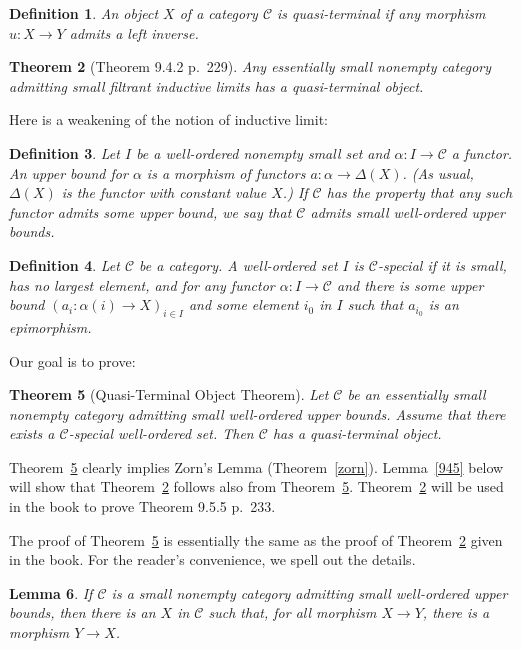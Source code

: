 \documentclass[12pt]{article}%
\newtheorem{thm}{Theorem}%
\newtheorem{lem}[thm]{Lemma}
\newtheorem{df}[thm]{Definition}%
\theoremstyle{remark}
\theoremstyle{definition}
\newcommand{\C}{\mathcal C}
\begin{document}
\begin{df}
An object $X$ of a category $\C$ is {\em quasi-terminal} if any morphism $u:X\to Y$ admits a left inverse.
\end{df}

\begin{thm}[Theorem 9.4.2 p.~229]\label{942}
Any essentially small nonempty category admitting small filtrant inductive limits has a quasi-terminal object.
\end{thm}

Here is a weakening of the notion of inductive limit:

\begin{df}
Let $I$ be a well-ordered nonempty small set and $\alpha:I\to\C$ a functor. An {\em upper bound} for $\alpha$ is a morphism of functors $a:\alpha\to\Delta(X)$. (As usual, $\Delta(X)$ is the functor with constant value $X$.) If $\C$ has the property that any such functor admits some upper bound, we say that $\C$ {\em admits small well-ordered upper bounds}.
\end{df}

\begin{df}
Let $\C$ be a category. A well-ordered set $I$ is $\C$-{\em special} if it is small, has no largest element, and for any functor $\alpha:I\to\C$ and there is some upper bound $(a_i:\alpha(i)\to X)_{i\in I}$ and some element $i_0$ in $I$ such that $a_{i_0}$ is an epimorphism. 
\end{df}

Our goal is to prove:

\begin{thm}[Quasi-Terminal Object Theorem]\label{qtot}
Let $\C$ be an essentially small nonempty category admitting small well-ordered upper bounds. Assume that there exists a $\C$-special well-ordered set. Then $\C$ has a quasi-terminal object.
\end{thm}

Theorem~\ref{qtot} clearly implies Zorn's Lemma (Theorem~\ref{zorn}). Lemma~\ref{945} below will show that Theorem~\ref{942} follows also from Theorem~\ref{qtot}. Theorem~\ref{942} will be used in the book to prove Theorem 9.5.5 p.~233.

The proof of Theorem~\ref{qtot} is essentially the same as the proof of Theorem~\ref{942} given in the book. For the reader's convenience, we spell out the details. 

\begin{lem}\label{943}
If $\C$ is a small nonempty category admitting small well-ordered upper bounds, then there is an $X$ in $\C$ such that, for all morphism $X\to Y$, there is a morphism $Y\to X$.
\end{lem}
\end{document}
